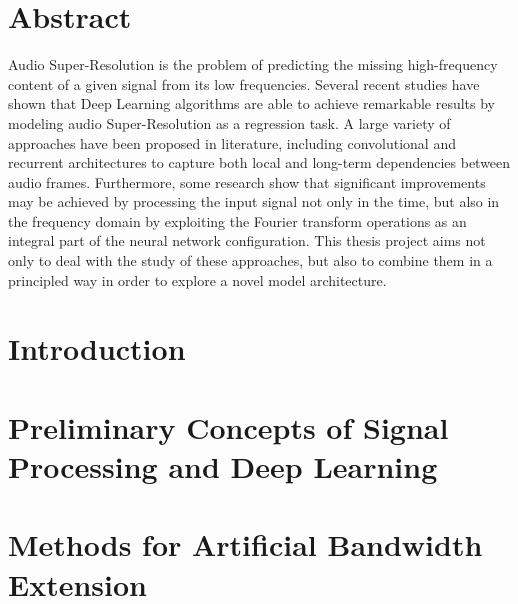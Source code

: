 \documentclass[a4paper,12pt]{book}
\begin{document}
\chapter*{Abstract} %
Audio Super-Resolution is the problem of predicting the missing high-frequency content of a given signal from its low frequencies. Several recent studies have shown that Deep Learning algorithms are able to achieve remarkable results by modeling audio Super-Resolution as a regression task. A large variety of approaches have been proposed in literature, including convolutional and recurrent architectures to capture both local and long-term dependencies between audio frames. Furthermore, some research show that significant improvements may be achieved by processing the input signal not only in the time, but also in the frequency domain by exploiting the Fourier transform operations as an integral part of the neural network configuration. This thesis project aims not only to deal with the study of these approaches, but also to combine them in a principled way in order to explore a novel model architecture. 

\printglossary[title={List of Abbreviations},type=acronym,style=long]

\listoffigures

\listoftables


\tableofcontents

\chapter{Introduction} \label{chap:intro}

\chapter{Preliminary Concepts of Signal Processing and Deep Learning} \label{chap:theory}

\chapter{Methods for Artificial Bandwidth Extension} \label{chap:methods}
\end{document}

